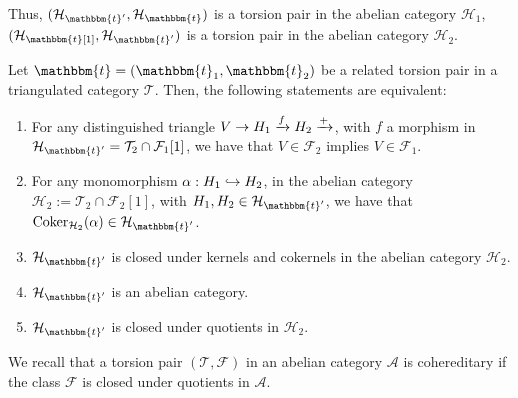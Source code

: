 \begin{rmk}
\begin{enumerate}
      Thus, $(\mathcal{H}_{\mathbbm{t}'},\mathcal{H}_\mathbbm{t})$ is a torsion pair in the abelian
      category $\mathcal{H}_1$,
      $(\mathcal{H}_\mathbbm{t}[1],\mathcal{H}_{\mathbbm{t}'})$ is a torsion pair in the abelian category
      $\mathcal{H}_2$.
  \end{enumerate}
\end{rmk}

\begin{corollary}
  Let $\mathbbm{t}=(\mathbbm{t}_1,\mathbbm{t}_2)$ be a related torsion pair in a triangulated category
  $\mathcal{T}$. Then, the following statements are equivalent:
  \begin{enumerate}[label=(\alph*)]
    \item For any distinguished triangle $V\to H_1\xrightarrow{f}H_2\xrightarrow{+}$, with
    $f$ a morphism in $\mathcal{H}_{\mathbbm{t}'}=\mathcal{T}_2\cap\mathcal{F}_1[1]$,
    we have that $V\in\mathcal{F}_2$ implies $V\in\mathcal{F}_1$.
    \item For any monomorphism $\alpha:H_1\hookrightarrow H_2$, in the abelian category
    $\mathcal{H}_2:=\mathcal{T}_2\cap\mathcal{F}_2[1]$, with $H_1,H_2\in\mathcal{H}_{\mathbbm{t}'}$,
    we have that $\Coker_{\mathcal{H}_2}(\alpha)\in\mathcal{H}_{\mathbbm{t}'}$.
    \item $\mathcal{H}_{\mathbbm{t}'}$ is closed under kernels and cokernels in
    the abelian category $\mathcal{H}_2$.
    \item $\mathcal{H}_{\mathbbm{t}'}$ is an abelian category.
    \item $\mathcal{H}_{\mathbbm{t}'}$ is closed under quotients in $\mathcal{H}_2$.
  \end{enumerate}
\end{corollary}

We recall that a torsion pair $(\mathcal{T},\mathcal{F})$ in an abelian category
$\mathcal{A}$ is cohereditary if the class $\mathcal{F}$ is closed under quotients
in $\mathcal{A}$.

